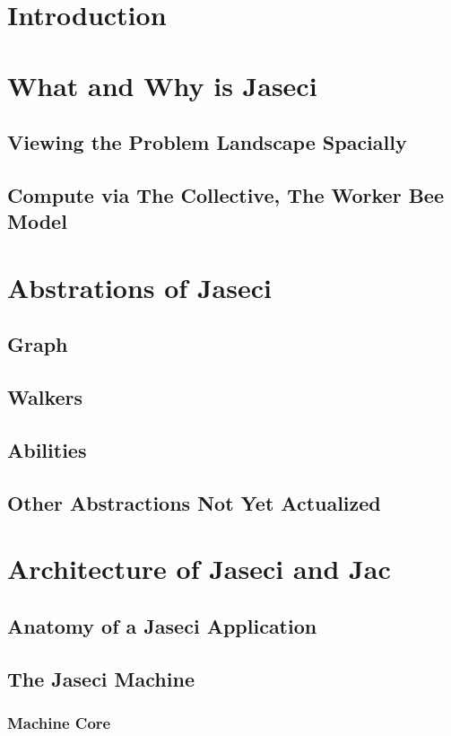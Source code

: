 \documentclass{book}
\begin{document}
\chapter{Introduction}


\chapter{What and Why is Jaseci}
\section{Viewing the Problem Landscape Spacially}
\section{Compute via The Collective, The Worker Bee Model}

\chapter{Abstrations of Jaseci}
\section{Graph}
\section{Walkers}
\section{Abilities}
\section{Other Abstractions Not Yet Actualized}

\chapter{Architecture of Jaseci and Jac}
\section{Anatomy of a Jaseci Application}
\section{The Jaseci Machine}
\subsection{Machine Core}
\end{document}
